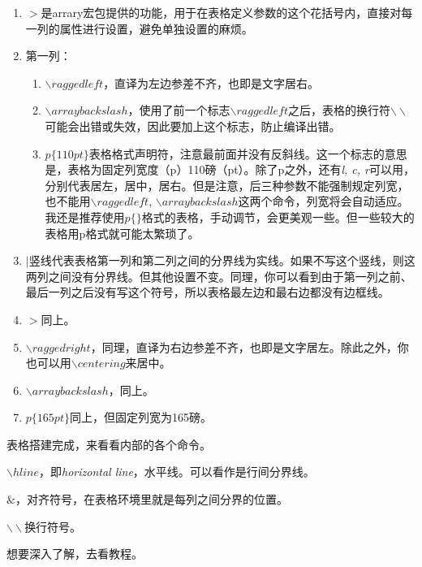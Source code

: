 \begin{enumerate}
\item $>$是arrary宏包提供的功能，用于在表格定义参数的这个花括号内，直接对每一列的属性进行设置，避免单独设置的麻烦。
\item 第一列：
\begin{enumerate}
\item $\backslash raggedleft$，直译为左边参差不齐，也即是文字居右。
\item $\backslash arraybackslash$，使用了前一个标志$\backslash raggedleft$之后，表格的换行符$\backslash\backslash$可能会出错或失效，因此要加上这个标志，防止编译出错。
\item $p\{110pt\}$表格格式声明符，注意最前面并没有反斜线。这一个标志的意思是，表格为固定列宽度（p）110磅（pt）。除了p之外，还有\textit{l, c, r}可以用，分别代表居左，居中，居右。但是注意，后三种参数不能强制规定列宽，也不能用$\backslash raggedleft$, $\backslash arraybackslash$这两个命令，列宽将会自动适应。我还是推荐使用$p\{\}$格式的表格，手动调节，会更美观一些。但一些较大的表格用p格式就可能太繁琐了。
\end{enumerate}
\item $|$竖线代表表格第一列和第二列之间的分界线为实线。如果不写这个竖线，则这两列之间没有分界线。但其他设置不变。同理，你可以看到由于第一列之前、最后一列之后没有写这个符号，所以表格最左边和最右边都没有边框线。
\item $>$同上。
\item $\backslash raggedright$，同理，直译为右边参差不齐，也即是文字居左。除此之外，你也可以用$\backslash centering$来居中。
\item $\backslash arraybackslash$，同上。
\item $p\{165pt\}$同上，但固定列宽为165磅。
\end{enumerate}\par
表格搭建完成，来看看内部的各个命令。\par
$\backslash hline$，即\textit{horizontal line}，水平线。可以看作是行间分界线。\par
$\&$，对齐符号，在表格环境里就是每列之间分界的位置。\par
$\backslash\backslash$换行符号。\par
想要深入了解，去看教程。\par

